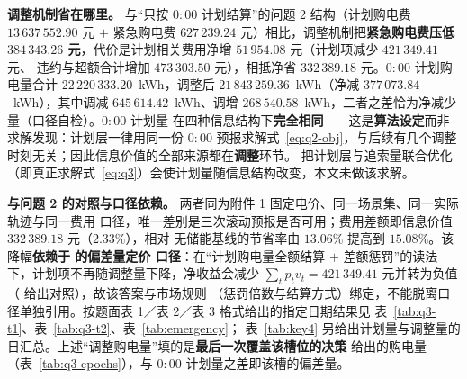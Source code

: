 \textbf{调整机制省在哪里。} 与“只按 \(0{:}00\) 计划结算”的问题 2 结构（计划购电费
\(13\,637\,552.90\) 元 \(+\) 紧急购电费 \(627\,239.24\) 元）相比，调整机制把\textbf{紧急购电费压低
\(384\,343.26\) 元}，代价是计划相关费用净增 \(51\,954.08\) 元（计划项减少 \(421\,349.41\) 元、
违约与超额合计增加 \(473\,303.50\) 元），相抵净省 \(332\,389.18\) 元。\(0{:}00\) 计划购电量合计
\(22\,220\,333.20\)~kWh，调整后 \(21\,843\,259.36\)~kWh（净减 \(377\,073.84\)~kWh），其中调减
\(645\,614.42\)~kWh、调增 \(268\,540.58\)~kWh，二者之差恰为净减少量（口径自检）。\(0{:}00\) 计划量
在四种信息结构下\textbf{完全相同}——这是\textbf{算法设定}而非求解发现：计划层一律用同一份 \(0{:}00\)
预报求解式~\eqref{eq:q2-obj}，与后续有几个调整时刻无关；因此信息价值的全部来源都在\textbf{调整}环节。
把计划层与追索量联合优化（即真正求解式~\eqref{eq:q3}）会使计划量随信息结构改变，本文未做该求解。

\textbf{与问题 2 的对照与口径依赖。} 两者同为附件 1 固定电价、同一场景集、同一实际轨迹与同一费用
口径，唯一差别是三次滚动预报是否可用；费用差额即信息价值 \(332\,389.18\) 元（\(2.33\%\)），相对
无储能基线的节省率由 \(13.06\%\) 提高到 \(15.08\%\)。该降幅\textbf{依赖于  的偏差量定价
口径}：在“计划购电量全额结算 \(+\) 差额惩罚”的读法下，计划项不再随调整量下降，净收益会减少
\(\sum_tp_tv_t=421\,349.41\) 元并转为负值（ 给出对照），故该答案与市场规则
（惩罚倍数与结算方式）绑定，不能脱离口径单独引用。按题面表 1／表 2／表 3 格式给出的指定日期结果见
表~\ref{tab:q3-t1}、表~\ref{tab:q3-t2}、表~\ref{tab:emergency}；
表~\ref{tab:key4} 另给出计划量与调整量的日汇总。上述“调整购电量”填的是\textbf{最后一次覆盖该槽位的决策}
给出的购电量（表~\ref{tab:q3-epochs}），与 \(0{:}00\) 计划量之差即该槽的偏差量。
